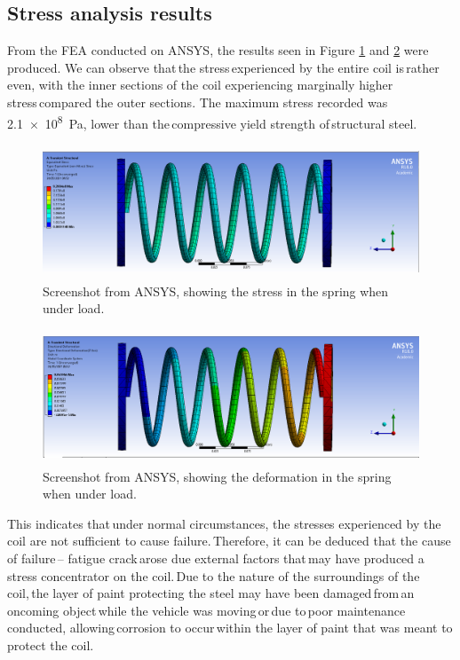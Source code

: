 \documentclass[11pt]{article}
\begin{document}
\subsection{Stress analysis results}
From the FEA conducted on ANSYS, the results seen in Figure \ref{fig:deformation1} and \ref{fig:stress1} were produced. We can observe that the stress experienced by the entire coil is rather even, with the inner sections of the coil experiencing marginally higher stress compared the outer sections. The maximum stress recorded was \SI{2.1e8}{\pascal}, lower than the compressive yield strength of structural steel.  
\begin{figure}[H]
    \centering
    \includegraphics[height = 4cm]{./img/springanalysisvonmises.png}
    \caption{Screenshot from ANSYS, showing the stress in the spring when under load.}
    \label{fig:deformation1}
\end{figure}
\begin{figure}[H]
    \centering
    \includegraphics[height = 4cm]{./img/springanalysisdisplacement.png}
    \caption{Screenshot from ANSYS, showing the deformation in the spring when under load.}
    \label{fig:stress1}
\end{figure}
This indicates that under normal circumstances, the stresses experienced by the coil are not sufficient to cause failure. Therefore, it can be deduced that the cause of failure – fatigue crack arose due external factors that may have produced a stress concentrator on the coil. Due to the nature of the surroundings of the coil, the layer of paint protecting the steel may have been damaged from an oncoming object while the vehicle was moving or due to poor maintenance conducted, allowing corrosion to occur within the layer of paint that was meant to protect the coil.  
\end{document}
